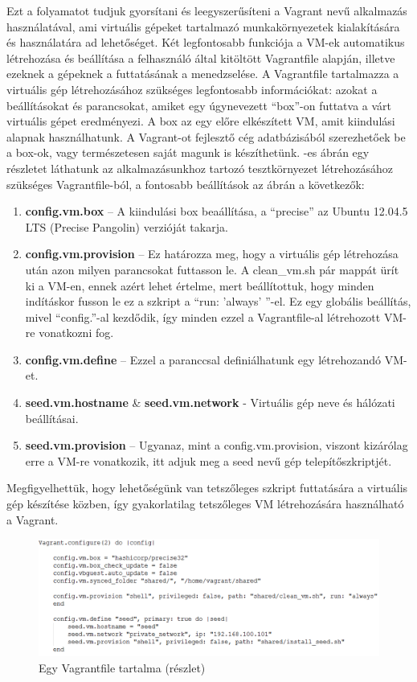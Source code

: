 Ezt a folyamatot tudjuk gyorsítani és leegyszerűsíteni a Vagrant\cite{vagrant} nevű alkalmazás használatával, ami virtuális gépeket tartalmazó munkakörnyezetek kialakítására és használatára ad lehetőséget. Két legfontosabb funkciója a VM-ek automatikus létrehozása és beállítása a felhasználó által kitöltött Vagrantfile alapján, illetve ezeknek a gépeknek a futtatásának a menedzselése. A Vagrantfile tartalmazza a virtuális gép létrehozásához szükséges legfontosabb információkat: azokat a beállításokat és parancsokat, amiket egy úgynevezett ``box''-on futtatva a várt virtuális gépet eredményezi. A box az egy előre elkészített VM, amit kiindulási alapnak használhatunk. A Vagrant-ot fejlesztő cég adatbázisából\cite{atlas} szerezhetőek be a box-ok, vagy természetesen saját magunk is készíthetünk. -es ábrán egy részletet láthatunk az alkalmazásunkhoz tartozó tesztkörnyezet létrehozásához szükséges Vagrantfile-ból, a fontosabb beállítások az ábrán a következők:

\begin{enumerate}
  \item \textbf{config.vm.box} -- A kiindulási box beaállítása, a ``precise'' az Ubuntu 12.04.5 LTS (Precise Pangolin)\cite{ubuntu} verzióját takarja.
  \item	\textbf{config.vm.provision} -- Ez határozza meg, hogy a virtuális gép létrehozása után azon milyen parancsokat futtasson le. A clean\_vm.sh pár mappát ürít ki a VM-en, ennek azért lehet értelme, mert beállítottuk, hogy minden indításkor fusson le ez a szkript a ``run: 'always' ''-el. Ez egy globális beállítás, mivel ``config.''-al kezdődik, így minden ezzel a Vagrantfile-al létrehozott VM-re vonatkozni fog.
  \item \textbf{config.vm.define} -- Ezzel a paranccsal definiálhatunk egy létrehozandó VM-et.
  \item \textbf{seed.vm.hostname} \& \textbf{seed.vm.network} - Virtuális gép neve és hálózati beállításai.
  \item \textbf{seed.vm.provision} -- Ugyanaz, mint a config.vm.provision, viszont kizárólag erre a VM-re vonatkozik, itt adjuk meg a seed nevű gép telepítőszkriptjét.
\end{enumerate}
 
Megfigyelhettük, hogy lehetőségünk van tetszőleges szkript futtatására a virtuális gép készítése közben, így gyakorlatilag tetszőleges VM létrehozására használható a Vagrant.

\begin{figure}[ht]
	\centering
	\includegraphics[width=140mm, keepaspectratio]{figures/vagrantfile.png}
	\caption{Egy Vagrantfile tartalma (részlet)}
	\label{fig:vagrantfile}
\end{figure}

